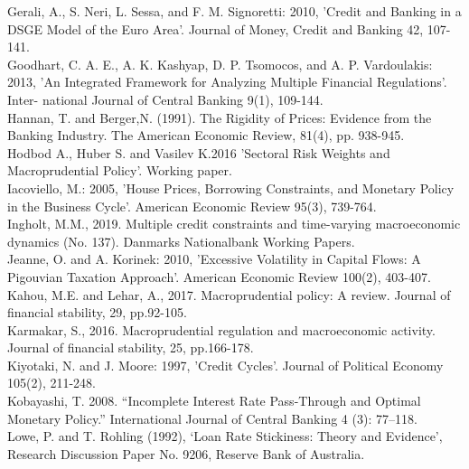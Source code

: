 \documentclass[12pt]{article}
\numberwithin{equation}{section}
\begin{document}
Gerali, A., S. Neri, L. Sessa, and F. M. Signoretti: 2010, 'Credit and Banking in
a DSGE Model of the Euro Area'. Journal of Money, Credit and Banking 42,
107-141.\\

Goodhart, C. A. E., A. K. Kashyap, D. P. Tsomocos, and A. P. Vardoulakis: 2013,
'An Integrated Framework for Analyzing Multiple Financial Regulations'. Inter-
national Journal of Central Banking 9(1), 109-144.\\

Hannan, T. and Berger,N. (1991). The Rigidity of Prices: Evidence from the
Banking Industry. The American Economic Review, 81(4), pp. 938-945. \\

 Hodbod A.,  Huber S. and Vasilev K.2016 'Sectoral Risk Weights and Macroprudential Policy'. Working paper.\\
 
Iacoviello, M.: 2005, 'House Prices, Borrowing Constraints, and Monetary Policy in
the Business Cycle'. American Economic Review 95(3), 739-764.\\

Ingholt, M.M., 2019. Multiple credit constraints and time-varying macroeconomic dynamics (No. 137). Danmarks Nationalbank Working Papers.\\



Jeanne, O. and A. Korinek: 2010, 'Excessive Volatility in Capital Flows: A Pigouvian
Taxation Approach'. American Economic Review 100(2), 403-407.\\

Kahou, M.E. and Lehar, A., 2017. Macroprudential policy: A review. Journal of financial stability, 29, pp.92-105.\\

Karmakar, S., 2016. Macroprudential regulation and macroeconomic activity. Journal of financial stability, 25, pp.166-178.\\

Kiyotaki, N. and J. Moore: 1997, 'Credit Cycles'. Journal of Political Economy
105(2), 211-248.\\

Kobayashi, T. 2008. “Incomplete Interest Rate Pass-Through and
Optimal Monetary Policy.” International Journal of Central
Banking 4 (3): 77–118.\\




Lowe, P. and T. Rohling (1992), ‘Loan Rate Stickiness: Theory and Evidence’, Research Discussion Paper No. 9206, Reserve Bank of Australia.\\
\end{document}
